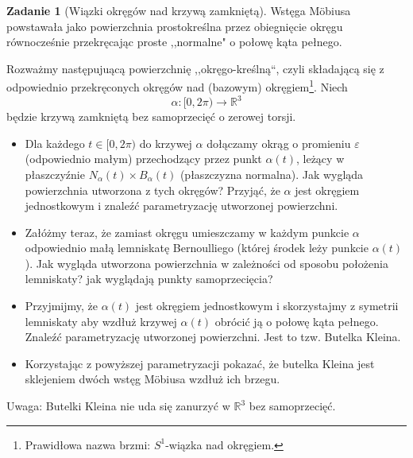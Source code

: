 \documentclass[a4paper,11pt]{article}
\theoremstyle{definition}\newtheorem{exercise}{Zadanie}
\theoremstyle{definition}\newtheorem{remark}{Uwaga}
\begin{document}
\begin{exercise}[Wiązki okręg\'ow nad krzywą zamkniętą]
Wstęga M\"obiusa powstawała jako powierzchnia prostokreślna przez obiegnięcie 
okręgu r\'ownocześnie przekręcając proste ,,normalne" o połowę kąta pełnego.

Rozważmy następujuącą powierzchnię ,,okręgo-kreślną``, czyli składającą się z 
odpowiednio przekręconych okręgów nad (bazowym) okręgiem\footnote{
Prawidłowa nazwa brzmi: $S^1$-wiązka nad okręgiem.}. Niech \[\alpha\colon 
[0,2\pi)\to \mathbb{R}^3\] będzie krzywą zamkniętą bez samoprzecięć o zerowej 
torsji. 

\begin{itemize}
 \item Dla każdego $t\in [0,2\pi)$ do krzywej $\alpha$ 
dołączamy okrąg o promieniu $\varepsilon$ (odpowiednio małym) przechodzący 
przez punkt $\alpha(t)$, leżący w płaszczyźnie $N_{\alpha} (t)\times B_{\alpha} 
(t)$ (płaszczyzna normalna). Jak wygląda powierzchnia utworzona z tych 
okręg\'ow? Przyjąć, że $\alpha$ jest okręgiem jednostkowym i znaleźć 
parametryzację utworzonej powierzchni.
\item Zał\'ożmy teraz, że zamiast okręgu umieszczamy w każdym punkcie $\alpha$ 
odpowiednio małą lemniskatę Bernoulliego (kt\'orej środek leży punkcie 
$\alpha(t)$). Jak wygląda utworzona powierzchnia w zależności od sposobu 
położenia lemniskaty? jak wyglądają punkty samoprzecięcia?

\item Przyjmijmy, że $\alpha(t)$ jest okręgiem jednostkowym i skorzystajmy z 
symetrii lemniskaty aby wzdłuż krzywej $\alpha(t)$ obr\'ocić ją o połowę kąta 
pełnego. Znaleźć parametryzację utworzonej powierzchni. Jest to tzw. Butelka 
Kleina.

\item Korzystając z powyższej parametryzacji pokazać, że butelka Kleina jest 
sklejeniem dw\'och wstęg M\"obiusa wzdłuż ich brzegu.
\end{itemize}



\small {Uwaga: Butelki Kleina nie uda się zanurzyć w $\mathbb{R}^3$ bez 
samoprzecięć.}
\end{exercise}
\end{document}
